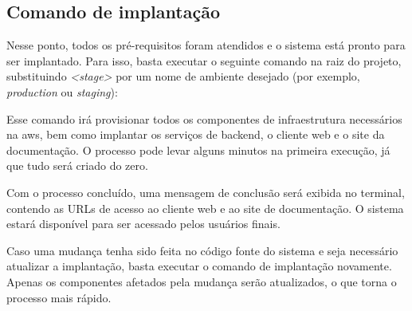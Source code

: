 \subsection{Comando de implanta\c{c}\~ao}
\label{subsec:comandoDeImplantacao}

Nesse ponto, todos os pré-requisitos foram atendidos e o sistema está pronto para ser implantado. Para isso, basta executar o seguinte comando na raiz do projeto, substituindo \textit{<stage>} por um nome de ambiente desejado (por exemplo, \textit{production} ou \textit{staging}):


Esse comando irá provisionar todos os componentes de infraestrutura necessários na \gls{aws}, bem como implantar os serviços de backend, o cliente web e o site da documentação. O processo pode levar alguns minutos na primeira execução, já que tudo será criado do zero.

Com o processo concluído, uma mensagem de conclusão será exibida no terminal, contendo as URLs de acesso ao cliente web e ao site de documentação. O sistema estará disponível para ser acessado pelos usuários finais.

Caso uma mudança tenha sido feita no código fonte do sistema e seja necessário atualizar a implantação, basta executar o comando de implantação novamente. Apenas os componentes afetados pela mudança serão atualizados, o que torna o processo mais rápido.
